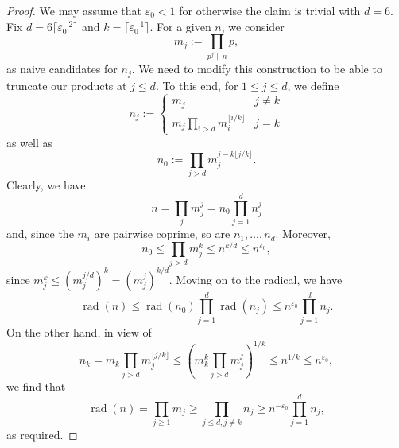 \documentclass[a4paper,11pt,twoside,reqno]{amsart}
\renewcommand{\leq}{\leqslant}
\renewcommand{\le}{\leqslant}
\renewcommand{\ge}{\geqslant}
\theoremstyle{plain}
\theoremstyle{remark}
\DeclareMathOperator\rad{rad}
\numberwithin{prop}{section}
\numberwithin{equation}{section}
\begin{document}
\begin{proof}
    We may assume that $\varepsilon_0<1$ for otherwise the claim is trivial with $d=6$.
        Fix $d=6\lceil \varepsilon_0^{-2}\rceil$ and $k=\lceil \varepsilon_0^{-1}\rceil$. For a given $n$, we consider 
    \[
    m_j:=\prod_{p^j\| n} p,
    \]
as  naive candidates for $n_j$.
We need to modify this construction to be able to truncate our products at $j \le d$. To this end, for $1 \le j \le d$, we define
    \[
    n_j:=\begin{cases} m_j & j \ne k\\ m_j \prod_{i>d} m_i^{\lfloor i/k\rfloor} & j=k \end{cases}
    \]
    as well as
    \[
    n_0:=\prod_{j>d} m_j^{j-k\lfloor j/k\rfloor}.
    \]
    Clearly, we have
    \[n=\prod_{j} m_j^j=n_0 \prod_{j=1}^d n_j^j
    \]
    and, since the $m_i$ are pairwise coprime, so are $n_1,\dots,n_d$. Moreover,
    \[
    n_0 \le \prod_{j>d} m_j^k \le n^{k/d} \le n^{\varepsilon_0},
    \]
    since $m_j^k\leq (m_j^{j/d})^k=(m_j^{j})^{k/d}$.
    Moving on to the radical, we have
    \[
    \rad(n) \le \rad(n_0)\prod_{j=1}^d \rad(n_j) \le n^{\varepsilon_0} \prod_{j=1}^d n_j.
    \]
On the other hand, in view of 
    \[
    n_k=m_k \prod_{j>d} m_j^{\lfloor j/k\rfloor} \le \left(m_k^k \prod_{j>d} m_j^j\right)^{1/k} \le n^{1/k} \le n^{\varepsilon_0},
    \]
    we find that
    \[
    \rad(n)=\prod_{j \ge 1} m_j \ge \prod_{j \le d, j \ne k} n_j \ge n^{-\varepsilon_0} \prod_{j=1}^d n_j,
    \]
    as required.
\end{proof}
\end{document}
